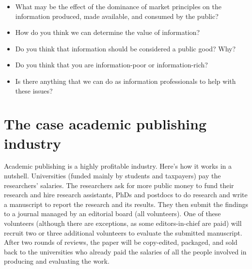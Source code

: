 \documentclass[
  letterpaper,
  DIV=11,
  numbers=noendperiod]{scrreprt}
\begin{document}
\begin{tcolorbox}[enhanced jigsaw, arc=.35mm, bottomrule=.15mm, bottomtitle=1mm, breakable, colback=white, colbacktitle=quarto-callout-tip-color!10!white, colframe=quarto-callout-tip-color-frame, coltitle=black, left=2mm, leftrule=.75mm, opacityback=0, opacitybacktitle=0.6, rightrule=.15mm, title=\textcolor{quarto-callout-tip-color}{\faLightbulb}\hspace{0.5em}{Pause and reflect}, titlerule=0mm, toprule=.15mm, toptitle=1mm]

\begin{itemize}
\item
  What may be the effect of the dominance of market principles on the
  information produced, made available, and consumed by the public?
\item
  How do you think we can determine the value of information?
\item
  Do you think that information should be considered a public good? Why?
\item
  Do you think that you are information-poor or information-rich?
\item
  Is there anything that we can do as information professionals to help
  with these issues?
\end{itemize}

\end{tcolorbox}

\section{The case academic publishing
industry}\label{the-case-academic-publishing-industry}

Academic publishing is a highly profitable industry. Here's how it works
in a nutshell. Universities (funded mainly by students and taxpayers)
pay the researchers' salaries. The researchers ask for more public money
to fund their research and hire research assistants, PhDs and postdocs
to do research and write a manuscript to report the research and its
results. They then submit the findings to a journal managed by an
editorial board (all volunteers). One of these volunteers (although
there are exceptions, as some editors-in-chief are paid) will recruit
two or three additional volunteers to evaluate the submitted manuscript.
After two rounds of reviews, the paper will be copy-edited, packaged,
and sold back to the universities who already paid the salaries of all
the people involved in producing and evaluating the work.
\end{document}
